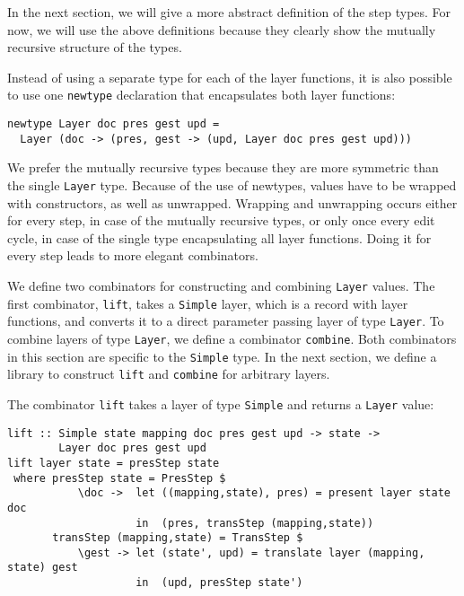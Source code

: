 \par In the next section, we will give a more abstract definition of the step
      types. For now, we will use the above definitions because they clearly show the
      mutually recursive structure of the types. 
\par 
\par Instead of using a separate type for each of the layer functions, it is
      also possible to use one \texttt{newtype} declaration that encapsulates both
      layer functions:\begin{small}\begin{verbatim}newtype Layer doc pres gest upd = 
  Layer (doc -> (pres, gest -> (upd, Layer doc pres gest upd)))\end{verbatim}\end{small}

\par We prefer the mutually recursive types because they are more symmetric
      than the single \texttt{Layer} type. Because of the use of newtypes, values
      have to be wrapped with constructors, as well as unwrapped. Wrapping and
      unwrapping occurs either for every step, in case of the mutually recursive
      types, or only once every edit cycle, in case of the single type encapsulating
      all layer functions. Doing it for every step leads to more elegant
      combinators.
\par We define two combinators for constructing and combining \texttt{Layer}
      values. The first combinator, \texttt{lift}, takes a \texttt{Simple} layer,
      which is a record with layer functions, and converts it to a direct parameter
      passing layer of type \texttt{Layer}. To combine layers of type \texttt{Layer},
      we define a combinator \texttt{combine}. Both combinators in this section are
      specific to the \texttt{Simple} type. In the next section, we define a library
      to construct \texttt{lift} and \texttt{combine} for arbitrary layers.
\par {}The combinator \texttt{lift} takes a layer
      of type \texttt{Simple} and returns a \texttt{Layer} value:\begin{small}\begin{verbatim}lift :: Simple state mapping doc pres gest upd -> state -> 
        Layer doc pres gest upd
lift layer state = presStep state 
 where presStep state = PresStep $
           \doc ->  let ((mapping,state), pres) = present layer state doc                                         
                    in  (pres, transStep (mapping,state))
       transStep (mapping,state) = TransStep $
           \gest -> let (state', upd) = translate layer (mapping, state) gest                     
                    in  (upd, presStep state')\end{verbatim}\end{small}

